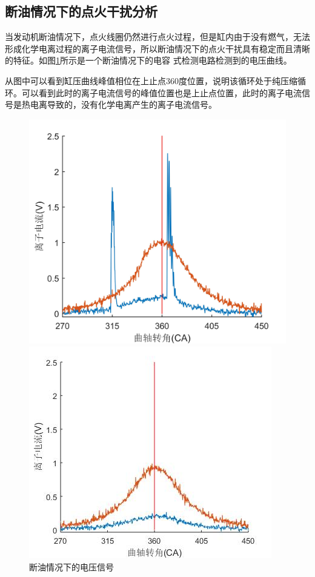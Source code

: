 \subsection{断油情况下的点火干扰分析}
当发动机断油情况下，点火线圈仍然进行点火过程，但是缸内由于没有燃气，无法形成化学电离过程的离子电流信号，所以断油情况下的点火干扰具有稳定而且清晰的特征。如图\ref{fig:dy_ion}所示是一个断油情况下的电容
式检测电路检测到的电压曲线。
\par 从图中可以看到缸压曲线峰值相位在上止点360度位置，说明该循环处于纯压缩循环。可以看到此时的离子电流信号的峰值位置也是上止点位置，此时的离子电流信号是热电离导致的，没有化学电离产生的离子电流信号。
\begin{figure}[H]
\begin{minipage}[t]{0.5\linewidth}
	\centering
	\includegraphics[width=\textwidth]{thesis_figure/ion_chapter/dy_ion}
	\caption{断油情况下的电压信号}
	\label{fig:dy_ion}
\end{minipage}
\begin{minipage}[t]{0.5\linewidth}
	\centering
	\includegraphics[width=\textwidth]{thesis_figure/ion_chapter/dh_ion}

\end{minipage}
\end{figure}
